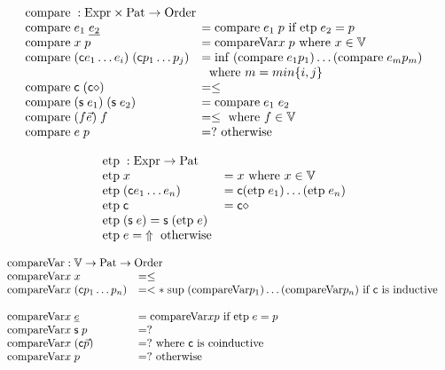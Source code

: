 \newcommand{\cmp}{\mathrm{compare}\;}
\newcommand{\cmpv}{\mathrm{compareVar}}
\newcommand{\cmps}{\mathrm{compareSize}}
\newcommand{\cmpsv}{\mathrm{compareSizeVar}}
\newcommand{\etp}{\mathrm{etp}\;}


\[
\begin{array}[t]{ll}
\multicolumn{2}{l}{\cmp : \Expr \times \Pat \ra \order}\\ 
\cmp e_1 \; \inacc{e_2} & = \cmp e_1 \; p \mbox{ if } \etp e_2 = p \\
\cmp x \; p & = \cmpv x \;p  \mbox{ where } x \in \cV \\
\cmp (\cc e_1 \ldots e_i) \; (\cc p_1 \ldots p_j ) & = \info (\cmp e_1 p_1) \ldots (\cmp e_m p_m)\\
& \; \mbox { where } m = min\{i,j\}\\ 
\cmp \cc \; (\cc \diamond) & = \leq \\
\cmp (\s e_1) \; (\s e_2) & = \cmp e_1 \; e_2 \\
\cmp (f \vec{e}) \; f & = \leq \mbox{ where } f \in \cV \\
\cmp e \; p & = ? \mbox{ otherwise}
\end{array}
\]

\[
\begin{array}[t]{ll}
\multicolumn{2}{l}{\etp : \Expr \ra \Pat}\\ 
\etp x & = x \mbox{ where } x \in \cV \\
\etp (\cc e_1 \ldots e_n ) & = \cc (\etp e_1) \ldots (\etp e_n) \\
\etp \cc  & = \cc \diamond \\
\etp (\s e) = \s (\etp e) \\
\etp e = \stuck \mbox{ otherwise}
\end{array}
\]

\[
\begin{array}[t]{ll}
\multicolumn{2}{l}{\cmpv : \cV \ra \Pat \ra \order}\\ 
\cmpv x \; x & = \leq \\
\cmpv x \; (\cc p_1 \ldots p_n ) & = < * \; \supo (\cmpv p_1) \ldots (\cmpv p_n) \mbox{ if } \cc \mbox{ is inductive }\\   \\
\cmpv x \; \inacc{e} & = \cmpv x p \mbox{ if } \etp e = p \\
\cmpv x \; \s p & = ? \\
\cmpv x \; (\cc \vec{p}) & = ? \mbox{ where } \cc \mbox{ is coinductive}\\
\cmpv x \; p & = ? \mbox{ otherwise}
\end{array}
\]

